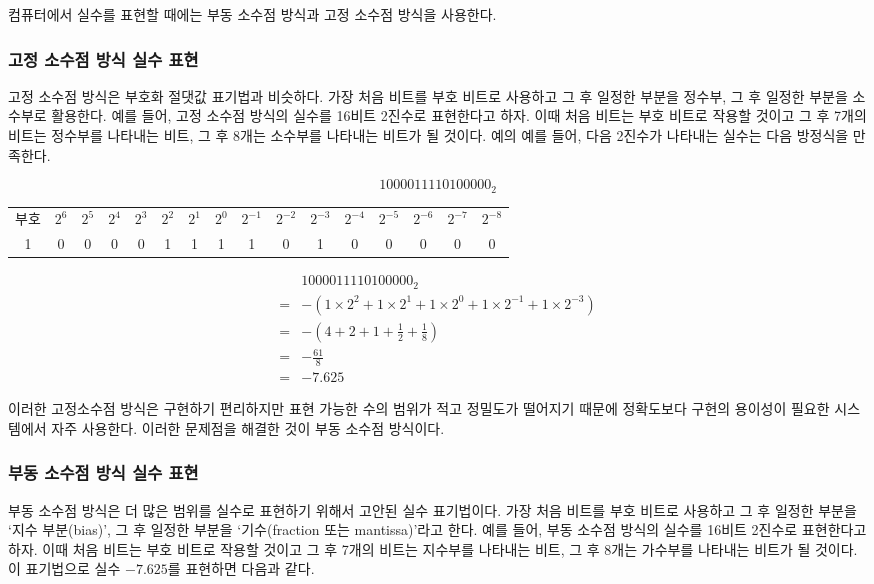 \documentclass{article}
\begin{document}
컴퓨터에서 실수를 표현할 때에는 부동 소수점 방식과 고정 소수점 방식을 사용한다.

\subsubsection{고정 소수점 방식 실수 표현}

고정 소수점 방식은 부호화 절댓값 표기법과 비슷하다. 가장 처음 비트를 부호 비트로 사용하고
그 후 일정한 부분을 정수부, 그 후 일정한 부분을 소수부로 활용한다.
예를 들어, 고정 소수점 방식의 실수를 16비트 2진수로 표현한다고 하자.
이때 처음 비트는 부호 비트로 작용할 것이고 그 후 7개의 비트는 정수부를 나타내는 비트,
그 후 8개는 소수부를 나타내는 비트가 될 것이다.
예의 예를 들어, 다음 2진수가 나타내는 실수는 다음 방정식을 만족한다.

$$
1 0000111 10100000_2
$$

\begin{center}
    \begin{tabular}{c|ccccccc|cccccccc}
        부호 & $2^6$ & $2^5$ & $2^4$ & $2^3$ & $2^2$ & $2^1$ & $2^0$ & $2^{-1}$ & $2^{-2}$ & $2^{-3}$ & $2^{-4}$ & $2^{-5}$ & $2^{-6}$ & $2^{-7}$ & $2^{-8}$ \\
        1 & 0 & 0 & 0 & 0 & 1 & 1 & 1 & 1 & 0 & 1 & 0 & 0 & 0 & 0 & 0
    \end{tabular}
\end{center}

$$
\begin{aligned}
    & 1000011110100000_2 \\
    =& -\left(1 \times 2^2 + 1 \times 2^1 + 1 \times 2^0 + 1 \times 2^{-1} + 1 \times 2^{-3}\right) \\
    =& -\left(4 + 2 + 1 + \frac{1}{2} + \frac{1}{8}\right) \\
    =& -\frac{61}{8} \\
    =& -7.625
\end{aligned}
$$

이러한 고정소수점 방식은 구현하기 편리하지만 표현 가능한 수의 범위가 적고 정밀도가 떨어지기
때문에 정확도보다 구현의 용이성이 필요한 시스템에서 자주 사용한다.
이러한 문제점을 해결한 것이 부동 소수점 방식이다.

\subsubsection{부동 소수점 방식 실수 표현}

부동 소수점 방식은 더 많은 범위를 실수로 표현하기 위해서 고안된 실수 표기법이다.
가장 처음 비트를 부호 비트로 사용하고 그 후 일정한 부분을 `지수 부분(bias)', 그 후 일정한
부분을 `기수(fraction 또는 mantissa)'라고 한다.
예를 들어, 부동 소수점 방식의 실수를 16비트 2진수로 표현한다고 하자.
이때 처음 비트는 부호 비트로 작용할 것이고 그 후 7개의 비트는 지수부를 나타내는 비트,
그 후 8개는 가수부를 나타내는 비트가 될 것이다.
이 표기법으로 실수 $-7.625$를 표현하면 다음과 같다.
\end{document}
